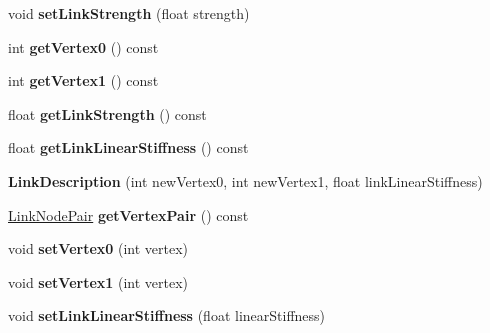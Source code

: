 \begin{DoxyCompactItemize}
void {\bfseries set\+Link\+Strength} (float strength)
\item 
\mbox{\label{classbtSoftBodyLinkData_1_1LinkDescription_ac047cd3991e25f8ef85601e3d5fac4c0}} 
int {\bfseries get\+Vertex0} () const
\item 
\mbox{\label{classbtSoftBodyLinkData_1_1LinkDescription_af794a59212f929bbdcb46e768318baec}} 
int {\bfseries get\+Vertex1} () const
\item 
\mbox{\label{classbtSoftBodyLinkData_1_1LinkDescription_a1f556c9934eeffb55dfd765c86e54819}} 
float {\bfseries get\+Link\+Strength} () const
\item 
\mbox{\label{classbtSoftBodyLinkData_1_1LinkDescription_af4b843bf75fe5f05a463eae41a0de816}} 
float {\bfseries get\+Link\+Linear\+Stiffness} () const
\item 
\mbox{\label{classbtSoftBodyLinkData_1_1LinkDescription_ac136d09840b27f48ada71f5974add5f8}} 
{\bfseries Link\+Description} (int new\+Vertex0, int new\+Vertex1, float link\+Linear\+Stiffness)
\item 
\mbox{\label{classbtSoftBodyLinkData_1_1LinkDescription_a1e2dbebf72c49c52b30e30c20d246f21}} 
\hyperlink{classbtSoftBodyLinkData_1_1LinkNodePair}{Link\+Node\+Pair} {\bfseries get\+Vertex\+Pair} () const
\item 
\mbox{\label{classbtSoftBodyLinkData_1_1LinkDescription_ab3749f46658d57ce5a6cd805b0a65051}} 
void {\bfseries set\+Vertex0} (int vertex)
\item 
\mbox{\label{classbtSoftBodyLinkData_1_1LinkDescription_ac18b22edeb1c83f3e8e11f5671ae6b28}} 
void {\bfseries set\+Vertex1} (int vertex)
\item 
\mbox{\label{classbtSoftBodyLinkData_1_1LinkDescription_aa3b2478b69b3baa1ea31c0523899bc0b}} 
void {\bfseries set\+Link\+Linear\+Stiffness} (float linear\+Stiffness)

\end{DoxyCompactItemize}
